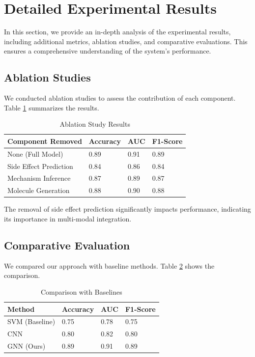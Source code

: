 \documentclass[12pt,a4paper]{article}
\begin{document}
\section{Detailed Experimental Results}
\label{sec:exp_results}

In this section, we provide an in-depth analysis of the experimental results, including additional metrics, ablation studies, and comparative evaluations. This ensures a comprehensive understanding of the system's performance.

\subsection{Ablation Studies}
We conducted ablation studies to assess the contribution of each component. Table \ref{tab:ablation} summarizes the results.

\begin{table}[H]
\centering
\caption{Ablation Study Results}
\label{tab:ablation}
\begin{tabular}{@{}llll@{}}
\toprule
Component Removed & Accuracy & AUC & F1-Score \\
\midrule
None (Full Model) & 0.89 & 0.91 & 0.89 \\
Side Effect Prediction & 0.84 & 0.86 & 0.84 \\
Mechanism Inference & 0.87 & 0.89 & 0.87 \\
Molecule Generation & 0.88 & 0.90 & 0.88 \\
\bottomrule
\end{tabular}
\end{table}

The removal of side effect prediction significantly impacts performance, indicating its importance in multi-modal integration.

\subsection{Comparative Evaluation}
We compared our approach with baseline methods. Table \ref{tab:compare} shows the comparison.

\begin{table}[H]
\centering
\caption{Comparison with Baselines}
\label{tab:compare}
\begin{tabular}{@{}llll@{}}
\toprule
Method & Accuracy & AUC & F1-Score \\
\midrule
SVM (Baseline) & 0.75 & 0.78 & 0.75 \\
CNN & 0.80 & 0.82 & 0.80 \\
GNN (Ours) & 0.89 & 0.91 & 0.89 \\
\bottomrule
\end{tabular}
\end{table}
\end{document}
